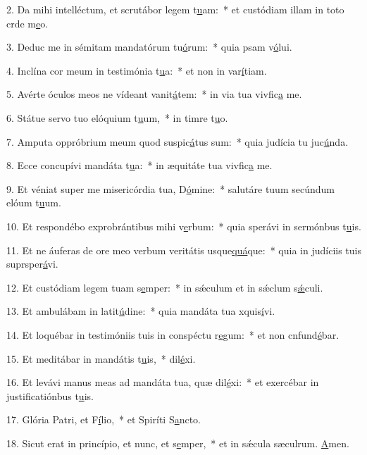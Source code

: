 2. Da mihi intelléctum, et scrutábor legem t\uline{u}am:~* et custódiam illam in toto crde m\uline{e}o.\par 
3. Deduc me in sémitam mandatórum tu\uline{ó}rum:~* quia psam v\uline{ó}lui.\par 
4. Inclína cor meum in testimónia t\uline{u}a:~* et non in var\uline{í}tiam.\par 
5. Avérte óculos meos ne vídeant vanit\uline{á}tem:~* in via tua vivfic\uline{a} me.\par 
6. Státue servo tuo elóquium t\uline{u}um,~* in timre t\uline{u}o.\par 
7. Amputa oppróbrium meum quod suspic\uline{á}tus sum:~* quia judícia tu juc\uline{ú}nda.\par 
8. Ecce concupívi mandáta t\uline{u}a:~* in æquitáte tua vivfic\uline{a} me.\par 
9. Et véniat super me misericórdia tua, D\uline{ó}mine:~* salutáre tuum secúndum elóum t\uline{u}um.\par 
10. Et respondébo exprobrántibus mihi v\uline{e}rbum:~* quia sperávi in sermónbus t\uline{u}is.\par 
11. Et ne áuferas de ore meo verbum veritátis usque\uline{quá}que:~* quia in judíciis tuis suprsper\uline{á}vi.\par 
12. Et custódiam legem tuam s\uline{e}mper:~* in sǽculum et in sǽclum s\uline{ǽ}culi.\par 
13. Et ambulábam in latit\uline{ú}dine:~* quia mandáta tua xquis\uline{í}vi.\par 
14. Et loquébar in testimóniis tuis in conspéctu r\uline{e}gum:~* et non cnfund\uline{é}bar.\par 
15. Et meditábar in mandátis t\uline{u}is,~*  dil\uline{é}xi.\par 
16. Et levávi manus meas ad mandáta tua, quæ dil\uline{é}xi:~* et exercébar in justificatiónbus t\uline{u}is.\par 
17. Glória Patri, et F\uline{í}lio,~* et Spiríti S\uline{a}ncto.\par 
18. Sicut erat in princípio, et nunc, et s\uline{e}mper,~* et in sǽcula sæculrum. \uline{A}men.\par 

